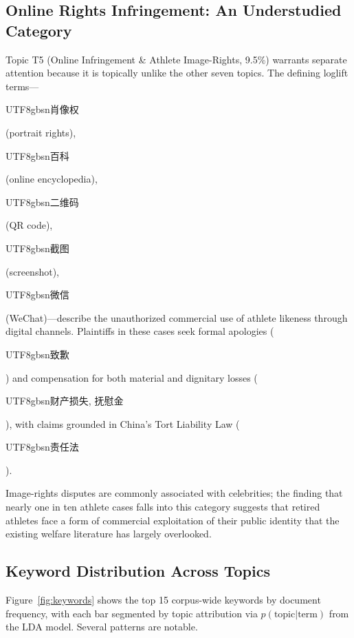 \documentclass[10pt,letterpaper]{article}
\begin{document}
\subsection{Online Rights Infringement: An Understudied Category}

Topic T5 (Online Infringement \& Athlete Image-Rights, 9.5\%) warrants separate attention because it is topically unlike the other seven topics. The defining loglift terms---\begin{CJK}{UTF8}{gbsn}肖像权\end{CJK} (portrait rights), \begin{CJK}{UTF8}{gbsn}百科\end{CJK} (online encyclopedia), \begin{CJK}{UTF8}{gbsn}二维码\end{CJK} (QR code), \begin{CJK}{UTF8}{gbsn}截图\end{CJK} (screenshot), \begin{CJK}{UTF8}{gbsn}微信\end{CJK} (WeChat)---describe the unauthorized commercial use of athlete likeness through digital channels. Plaintiffs in these cases seek formal apologies (\begin{CJK}{UTF8}{gbsn}致歉\end{CJK}) and compensation for both material and dignitary losses (\begin{CJK}{UTF8}{gbsn}财产损失, 抚慰金\end{CJK}), with claims grounded in China's Tort Liability Law (\begin{CJK}{UTF8}{gbsn}责任法\end{CJK}).

Image-rights disputes are commonly associated with celebrities; the finding that nearly one in ten athlete cases falls into this category suggests that retired athletes face a form of commercial exploitation of their public identity that the existing welfare literature has largely overlooked.

\subsection{Keyword Distribution Across Topics}

Figure~\ref{fig:keywords} shows the top 15 corpus-wide keywords by document frequency, with each bar segmented by topic attribution via $p(\text{topic} | \text{term})$ from the LDA model. Several patterns are notable.
\end{document}
